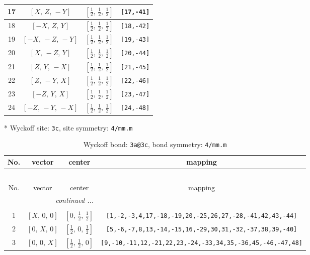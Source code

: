 \documentclass[fleqn,8pt]{jsarticle}
\begin{document}
\begin{longtable}{cccc}
17 & $\left[ X,\, Z,\, - Y \right]$ & $\left[ \frac{1}{2},\, \frac{1}{2},\, \frac{1}{2} \right]$ & {\tt [17,-41]} \\ \hline
18 & $\left[ - X,\, Z,\, Y \right]$ & $\left[ \frac{1}{2},\, \frac{1}{2},\, \frac{1}{2} \right]$ & {\tt [18,-42]} \\ \hline
19 & $\left[ - X,\, - Z,\, - Y \right]$ & $\left[ \frac{1}{2},\, \frac{1}{2},\, \frac{1}{2} \right]$ & {\tt [19,-43]} \\ \hline
20 & $\left[ X,\, - Z,\, Y \right]$ & $\left[ \frac{1}{2},\, \frac{1}{2},\, \frac{1}{2} \right]$ & {\tt [20,-44]} \\ \hline
21 & $\left[ Z,\, Y,\, - X \right]$ & $\left[ \frac{1}{2},\, \frac{1}{2},\, \frac{1}{2} \right]$ & {\tt [21,-45]} \\ \hline
22 & $\left[ Z,\, - Y,\, X \right]$ & $\left[ \frac{1}{2},\, \frac{1}{2},\, \frac{1}{2} \right]$ & {\tt [22,-46]} \\ \hline
23 & $\left[ - Z,\, Y,\, X \right]$ & $\left[ \frac{1}{2},\, \frac{1}{2},\, \frac{1}{2} \right]$ & {\tt [23,-47]} \\ \hline
24 & $\left[ - Z,\, - Y,\, - X \right]$ & $\left[ \frac{1}{2},\, \frac{1}{2},\, \frac{1}{2} \right]$ & {\tt [24,-48]} \\
\end{longtable}
* Wyckoff site: {\tt 3c}, site symmetry: {\tt 4/mm.m}
\renewcommand{\arraystretch}{1.2}
\begin{longtable}{cccc}
\caption{Wyckoff bond: {\tt 3a@3c}, bond symmetry: {\tt 4/mm.m}}
 \\
 \hline \hline
No. & vector & center & mapping \\ \hline \endfirsthead

\multicolumn{3}{l}{\tablename\ \thetable{}} \\
 \hline \hline
No. & vector & center & mapping \\ \hline \endhead

 \hline \hline
\multicolumn{3}{r}{\footnotesize\it continued ...} \\ \endfoot

 \hline \hline
\multicolumn{3}{r}{} \\ \endlastfoot

1 & $\left[ X,\, 0,\, 0 \right]$ & $\left[ 0,\, \frac{1}{2},\, \frac{1}{2} \right]$ & {\tt [1,-2,-3,4,17,-18,-19,20,-25,26,27,-28,-41,42,43,-44]} \\ \hline
2 & $\left[ 0,\, X,\, 0 \right]$ & $\left[ \frac{1}{2},\, 0,\, \frac{1}{2} \right]$ & {\tt [5,-6,-7,8,13,-14,-15,16,-29,30,31,-32,-37,38,39,-40]} \\ \hline
3 & $\left[ 0,\, 0,\, X \right]$ & $\left[ \frac{1}{2},\, \frac{1}{2},\, 0 \right]$ & {\tt [9,-10,-11,12,-21,22,23,-24,-33,34,35,-36,45,-46,-47,48]} \\
\end{longtable}
\end{document}
